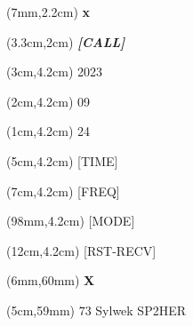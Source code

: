 \documentclass{article}
\begin{document}
\begin{textblock*}{4cm}(7mm,2.2cm) %
   \textbf{x}
\end{textblock*}
\begin{textblock*}{4cm}(3.3cm,2cm) %
	\LARGE\emph{\textbf{[CALL]}}
\end{textblock*}
\begin{textblock*}{2cm}(3cm,4.2cm) %
   2023
\end{textblock*}
\begin{textblock*}{1cm}(2cm,4.2cm) %
   09
\end{textblock*}
\begin{textblock*}{1cm}(1cm,4.2cm) %
   24
\end{textblock*}
\begin{textblock*}{1cm}(5cm,4.2cm) %
	[TIME]
\end{textblock*}
\begin{textblock*}{2cm}(7cm,4.2cm) %
	[FREQ]
\end{textblock*}
\begin{textblock*}{1cm}(98mm,4.2cm) %
	[MODE]
\end{textblock*}
\begin{textblock*}{1cm}(12cm,4.2cm) %
	[RST-RECV]
\end{textblock*}
\begin{textblock*}{1cm}(6mm,60mm) %
  \textbf{X}
\end{textblock*}
\begin{textblock*}{7cm}(5cm,59mm) %
   $73$ Sylwek SP2HER
\end{textblock*}
\end{document}
